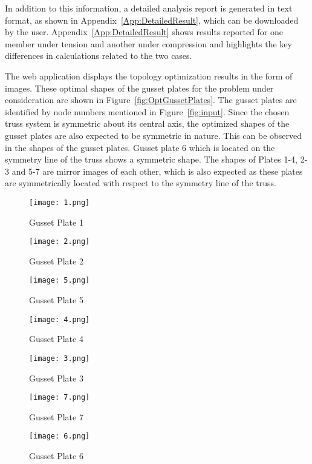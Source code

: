 \documentclass[preprint]{elsarticle}
\begin{document}
In addition to this information, a detailed analysis report is generated in text
format, as shown in Appendix~\ref{App:DetailedResult}, which can be downloaded by
the user. Appendix~\ref{App:DetailedResult} shows results reported for one
member under
tension and another under compression and highlights the key differences in
calculations related to the two cases.

The web application displays the topology optimization results in the form of
images. These optimal shapes of the gusset plates for the problem under
consideration are shown in Figure~\ref{fig:OptGussetPlates}. The gusset plates
are identified by node numbers mentioned in Figure~\ref{fig:input}. 
Since the chosen truss system is symmetric about its central axis, the optimized
shapes of the gusset plates are also expected to be symmetric in nature. This
can be observed in the shapes of the gusset plates. Gusset plate 6 which is
located on the symmetry line of the truss shows a symmetric shape. The shapes of 
Plates 1-4, 2-3 and 5-7 are mirror images of each other, which is also expected
as these plates are symmetrically located with respect to the symmetry line of
the truss.


\begin{figure*}[!htbp]
    \centering
    \begin{subfigure}{0.3\textwidth}
        \texttt{[image: 1.png]}
        \caption{Gusset Plate 1}
        \label{fig:GP1}
    \end{subfigure}
\begin{subfigure}{0.3\textwidth}
        \texttt{[image: 2.png]}
        \caption{Gusset Plate 2}
        \label{fig:GP2}
    \end{subfigure}
\begin{subfigure}{0.3\textwidth}
        \texttt{[image: 5.png]}
        \caption{Gusset Plate 5}
        \label{fig:GP5}
    \end{subfigure}

  \begin{subfigure}{0.3\textwidth}
    \texttt{[image: 4.png]}
    \caption{Gusset Plate 4}
    \label{fig:GP4}
  \end{subfigure}\begin{subfigure}{0.3\textwidth}
  \texttt{[image: 3.png]}
  \caption{Gusset Plate 3}
  \label{fig:GP3}
  \end{subfigure}
\begin{subfigure}{0.3\textwidth}
  \texttt{[image: 7.png]}
  \caption{Gusset Plate 7}
  \label{fig:GP7}
  \end{subfigure}

  \begin{subfigure}{0.3\textwidth}
  \texttt{[image: 6.png]}
  \caption{Gusset Plate 6}
  \label{fig:GP6}
  \end{subfigure}
\caption{Optimized shape of all the gusset plates. The number represents the nodal location at which the gusset plate is located. The plates number are positioned to show symmetry in results.}
\label{fig:OptGussetPlates}
\end{figure*}
\end{document}
